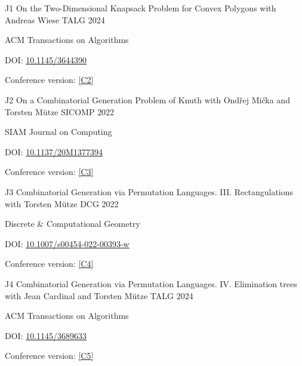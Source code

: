 
\vspace{{1 mm}}

\begin{cvpublication}
	{J1}
	{On the Two-Dimensional Knapsack Problem for Convex Polygons}
	{with Andreas Wiese}
	{TALG}
	{2024}
    {
	\begin{cvitems}
	\item ACM Transactions on Algorithms
	\item[] DOI: \href{https://doi.org/10.1145/3644390}{10.1145/3644390}
	\item Conference version: \hyperlink{paperC2}{[C2]}
	\end{cvitems}
	}
\end{cvpublication}
\begin{cvpublication}
	{J2}
	{On a Combinatorial Generation Problem of Knuth}
	{with Ondřej Mička and Torsten Mütze}
	{SICOMP}
	{2022}
    {
	\begin{cvitems}
	\item SIAM Journal on Computing
	\item[] DOI: \href{https://doi.org/10.1137/20M1377394}{10.1137/20M1377394}
	\item Conference version: \hyperlink{paperC3}{[C3]}
	\end{cvitems}
	}
\end{cvpublication}
\begin{cvpublication}
	{J3}
	{Combinatorial Generation via Permutation Languages. III. Rectangulations}
	{with Torsten Mütze}
	{DCG}
	{2022}
    {
	\begin{cvitems}
	\item Discrete \& Computational Geometry
	\item[] DOI: \href{https://doi.org/10.1007/s00454-022-00393-w}{10.1007/s00454-022-00393-w}
	\item Conference version: \hyperlink{paperC4}{[C4]}
	\end{cvitems}
	}
\end{cvpublication}
\begin{cvpublication}
	{J4}
	{Combinatorial Generation via Permutation Languages. IV. Elimination trees}
	{with Jean Cardinal and Torsten Mütze}
	{TALG}
	{2024}
    {
	\begin{cvitems}
	\item ACM Transactions on Algorithms
	\item[] DOI: \href{https://doi.org/10.1145/3689633}{10.1145/3689633}
	\item Conference version: \hyperlink{paperC5}{[C5]}
	\end{cvitems}
	}
\end{cvpublication}
